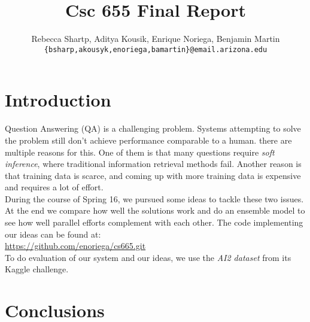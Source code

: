 \documentclass[11pt]{article}
\title{Csc 655 Final Report}
\author{Rebecca Shartp, Aditya Kousik, Enrique Noriega, Benjamin Martin\\
  {\tt \{bsharp,akousyk,enoriega,bamartin\}@email.arizona.edu} \\}
\date{}
\begin{document}
\maketitle
\begin{abstract}
  
\end{abstract}

\section{Introduction}

Question Answering (QA) is a challenging problem. Systems attempting to solve the problem still don't achieve performance comparable to a human. there are multiple reasons for this. One of them is that many questions require \emph{soft inference}, where traditional information retrieval methods fail. Another reason is that training data is scarce, and coming up with more training data is expensive and requires a lot of effort. \\

During the course of Spring 16, we pursued some ideas to tackle these two issues. At the end we compare how well the solutions work and do an ensemble model to see how well parallel efforts complement with each other. The code implementing our ideas can be found at:\\ 
\url{https://github.com/enoriega/cs665.git}\\

To do evaluation of our system and our ideas, we use the \emph{AI2 dataset} from its Kaggle challenge.








\section{Conclusions}



\end{document}
